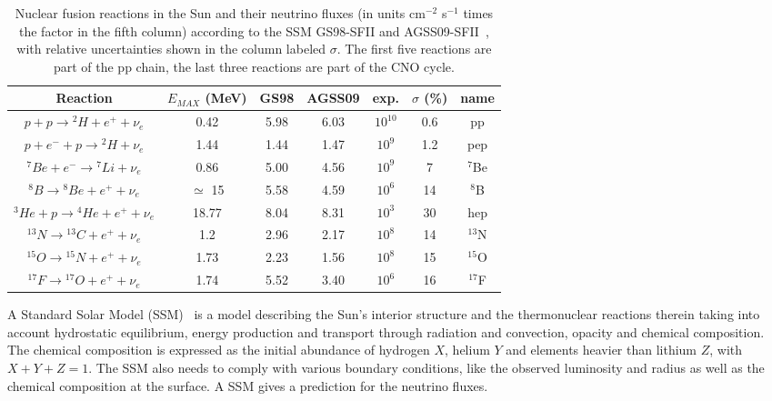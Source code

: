 \begin{table}
\caption{Nuclear fusion reactions in the Sun and their neutrino fluxes (in units cm$^{-2}$ s$^{-1}$ times the factor in the fifth column) according to the SSM GS98-SFII and AGSS09-SFII~\cite{serenelli}, with relative uncertainties shown in the column labeled $\sigma$. The first five reactions are part of the pp chain, the last three reactions are part of the CNO cycle.}
\centering
\begin{tabular}{|c|c|c|c|c|c|c|}
  \hline
  Reaction & $E_{MAX}$ (MeV) & GS98 & AGSS09& exp. & $\sigma$ (\%) &name \\ 
  \hline
$ p + p \rightarrow {^2}H + e ^+ + \nu_e$ & 0.42 & 5.98  & 6.03   & $10^{10}$ & 0.6 &pp \\
$ p + e^- + p \rightarrow {^2}H  + \nu_e$ & 1.44 & 1.44  &1.47& $10^{9}$  & 1.2 &pep \\
$ {^7}Be + e^- \rightarrow {^7}Li + \nu_e$ & 0.86 & 5.00 & 4.56& $10^{9}$  & 7 &$ {^7}$Be \\
$ {^8}B \rightarrow {^8}Be + e ^+ + \nu_e$ & $\simeq$ 15 & 5.58  &4.59  &  $10^{6}$  & 14 &$ {^8}$B\\
$  {^3}He + p \rightarrow {^4}He + e ^+ + \nu_e$ & 18.77 & 8.04  &8.31 &$10^{3}$  & 30 &hep \\
$ {^{13}}N \rightarrow {^{13}}C + e ^+ + \nu_e$ & 1.2 & 2.96 &2.17    &$10^{8}$  &14  &$ {^{13}}$N\\
$ {^{15}}O \rightarrow {^{15}}N + e ^+ + \nu_e$ & 1.73 & 2.23 &1.56    &$10^{8}$  & 15& $ {^{15}}$O\\
$ {^{17}}F \rightarrow {^{17}}O + e ^+ + \nu_e$ & 1.74 & 5.52  &3.40   &$10^{6}$  & 16 &$ {^{17}}$F\\
  \hline
\end{tabular}
\label{tab:snuflux}
\end{table}

A Standard Solar Model (SSM)~\cite{bahcall89} is a model describing the Sun's interior structure and the thermonuclear reactions therein taking into account hydrostatic equilibrium, energy production and transport through radiation and convection, opacity and chemical composition. The chemical composition is expressed as the initial abundance of hydrogen $X$, helium $Y$ and elements heavier than lithium $Z$, with $X+Y+Z = 1$.
The SSM also needs to comply with various boundary conditions, like the observed luminosity and radius as well as the chemical composition at the surface. A SSM gives a prediction for the neutrino fluxes. 




